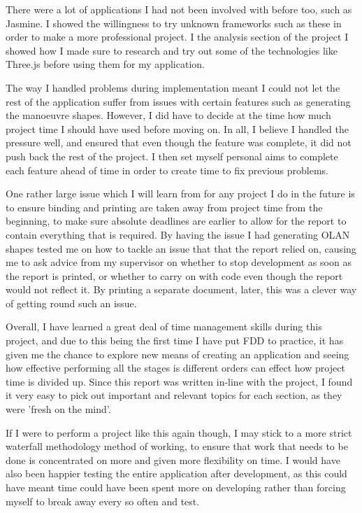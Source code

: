 There were a lot of applications I had not been involved with before too, such as Jasmine. I showed the willingness to try unknown frameworks such as these in order to make a more professional project. I the analysis section of the project I showed how I made sure to research and try out some of the technologies like Three.js before using them for my application.

The way I handled problems during implementation meant I could not let the rest of the application suffer from issues with certain features such as generating the manoeuvre shapes. However, I did have to decide at the time how much project time I should have used before moving on. In all, I believe I handled the pressure well, and ensured that even though the feature was complete, it did not push back the rest of the project. I then set myself personal aims to complete each feature ahead of time in order to create time to fix previous problems.

One rather large issue which I will learn from for any project I do in the future is to ensure binding and printing are taken away from project time from the beginning, to make sure absolute deadlines are earlier to allow for the report to contain everything that is required. By having the issue I had generating OLAN shapes tested me on how to tackle an issue that that the report relied on, causing me to ask advice from my supervisor on whether to stop development as soon as the report is printed, or whether to carry on with code even though the report would not reflect it. By printing a separate document, later, this was a clever way of getting round such an issue.

Overall, I have learned a great deal of time management skills during this project, and due to this being the first time I have put FDD to practice, it has given me the chance to explore new means of creating an application and seeing how effective performing all the stages is different orders can effect how project time is divided up. Since this report was written in-line with the project, I found it very easy to pick out important and relevant topics for each section, as they were 'fresh on the mind'.

If I were to perform a project like this again though, I may stick to a more strict waterfall methodology method of working, to ensure that work that needs to be done is concentrated on more and given more flexibility on time. I would have also been happier testing the entire application after development, as this could have meant time could have been spent more on developing rather than forcing myself to break away every so often and test.

